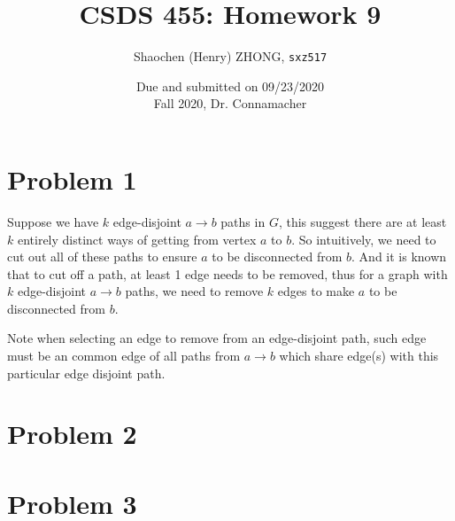 \documentclass[11pt]{article}
\newcommand{\ilc}{\texttt}
\begin{document}
\title{\textbf{CSDS 455: Homework 9}}

\author{Shaochen (Henry) ZHONG, \ilc{sxz517}}
\date{Due and submitted on 09/23/2020 \\ Fall 2020, Dr. Connamacher}
\maketitle

\section*{Problem 1}

Suppose we have $k$ edge-disjoint $a \to b$ paths in $G$, this suggest there are at least $k$ entirely distinct ways of getting from vertex $a$ to $b$. So intuitively, we need to cut out all of these paths to ensure $a$ to be disconnected from $b$. And it is known that to cut off a path, at least 1 edge needs to be removed, thus for a graph with $k$ edge-disjoint $a \to b$ paths, we need to remove $k$ edges to make $a$ to be disconnected from $b$.

Note when selecting an edge to remove from an edge-disjoint path, such edge must be an common edge of all paths from $a \to b$ which share edge(s) with this particular edge disjoint path.


\section*{Problem 2}
\section*{Problem 3}


%
% 
% 
\end{document}

